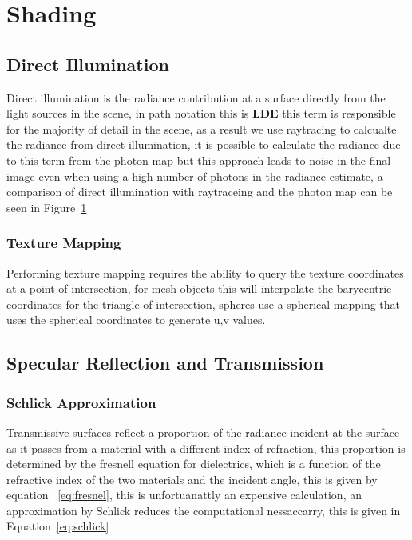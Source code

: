 \section{Shading}

\subsection{Direct Illumination}
Direct illumination is the radiance contribution at a surface directly from the light sources in the scene, in path notation
this is \textbf{LDE} this term is responsible for the majority of detail in the scene, as a result we use raytracing to calcualte
the radiance from direct illumination, it is possible to calculate the radiance due to this term from the photon map but this
approach leads to noise in the final image even when using a high number of photons in the radiance estimate, a comparison of
direct illumination with raytraceing and the photon map can be seen in Figure~\ref{fig:direct_compare}

\begin{figure}
\label{fig:direct_compare}
\end{figure}

\subsubsection{Texture Mapping}
Performing texture mapping requires the ability to query the texture coordinates at a point of intersection, for mesh objects this
will interpolate the barycentric coordinates for the triangle of intersection, spheres use a spherical mapping that uses the
spherical coordinates to generate u,v values.

\subsection{Specular Reflection and Transmission}
\subsubsection{Schlick Approximation}
Transmissive surfaces reflect a proportion of the radiance incident at the surface as it passes from a material with a different
index of refraction, this proportion is determined by the fresnell equation for dielectrics, which is a function of the refractive
index of the two materials and the incident angle, this is given by equation ~\ref{eq:fresnel}, this is unfortuanattly an expensive
calculation, an approximation by Schlick  reduces the computational nessaccarry, this is given in Equation~\ref{eq:schlick}


